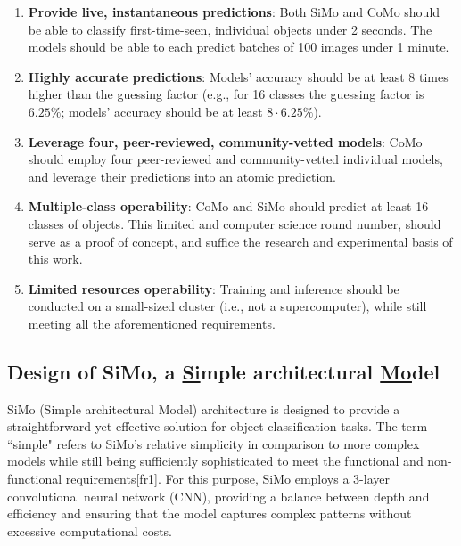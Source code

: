 \begin{enumerate}[label=\textbf{(NFR\arabic*)}, leftmargin=0pt, itemindent=3em]
    \item \label{nfr1} \textbf{Provide live, instantaneous predictions}: 
    Both SiMo and CoMo should be able to classify first-time-seen, individual objects under 2 seconds. The models should be able to each predict batches of 100 images under 1 minute.
    
    \item \label{nfr2} \textbf{Highly accurate predictions}: 
    Models' accuracy should be at least 8 times higher than the guessing factor (e.g., for 16 classes the guessing factor is $6.25\%$; models'  accuracy should be at least $ 8\cdot6.25\%$).
    
    \item \label{nfr3} \textbf{Leverage four, peer-reviewed, community-vetted models}: 
    CoMo should employ four peer-reviewed and community-vetted individual models, and leverage their predictions into an atomic prediction.

    \item \label{nfr4} \textbf{Multiple-class operability}: 
    CoMo and SiMo should predict at least 16 classes of objects. This limited and computer science round number, should serve as a proof of concept, and suffice the research and experimental basis of this work.

    \item \label{nfr5} \textbf{Limited resources operability}: 
    Training and inference should be conducted on a small-sized cluster (i.e., not a supercomputer), while still meeting all the aforementioned requirements.

    
\end{enumerate}


\subsection{Design of SiMo, a \underline{Si}mple architectural \underline{Mo}del}\label{sec:design:simo}

SiMo (Simple architectural Model) architecture is designed to provide a straightforward yet effective solution for object classification tasks. The term ``simple" refers to SiMo's relative simplicity in comparison to more complex models while still being sufficiently sophisticated to meet the functional and non-functional requirements\ref{fr1}. For this purpose, SiMo employs a 3-layer convolutional neural network (CNN), providing a balance between depth and efficiency and ensuring that the model captures complex patterns without excessive computational costs.

